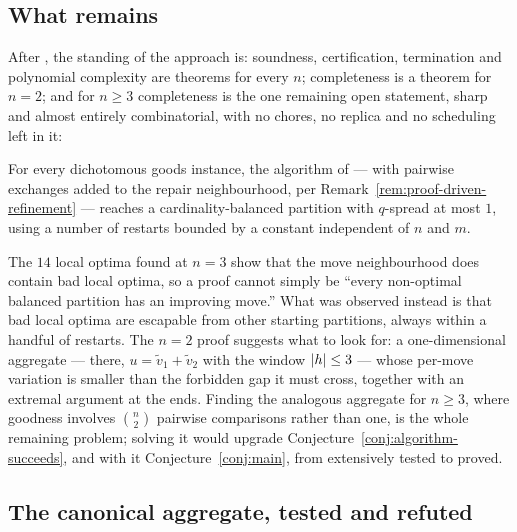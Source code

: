 \subsection{What remains}
\label{sec:construct-repair-remains}

After , the standing of the
approach is: soundness, certification, termination and polynomial complexity
are theorems for every $n$; completeness is a theorem for $n = 2$; and for
$n \ge 3$ completeness is the one remaining open statement, sharp and almost
entirely combinatorial, with no chores, no replica and no scheduling left in
it:

\begin{conjecture}
\label{conj:algorithm-succeeds}
For every dichotomous goods instance, the algorithm of
 --- with pairwise exchanges added to the repair
neighbourhood, per Remark~\ref{rem:proof-driven-refinement} --- reaches a
cardinality-balanced partition with $q$-spread at most $1$, using a number of
restarts bounded by a constant independent of $n$ and $m$.
\end{conjecture}

The $14$ local optima found at $n = 3$ show that the move neighbourhood does
contain bad local optima, so a proof cannot simply be ``every non-optimal
balanced partition has an improving move.'' What was observed instead is that
bad local optima are escapable from other starting partitions, always within a
handful of restarts. The $n = 2$ proof suggests what to look for: a
one-dimensional aggregate --- there, $u = \tilde{v}_1 + \tilde{v}_2$ with the
window $\left\lvert h\right\rvert \le 3$ --- whose per-move variation is smaller than the
forbidden gap it must cross, together with an extremal argument at the ends.
Finding the analogous aggregate for $n \ge 3$, where goodness involves
$\binom{n}{2}$ pairwise comparisons rather than one, is the whole remaining
problem; solving it would upgrade Conjecture~\ref{conj:algorithm-succeeds},
and with it Conjecture~\ref{conj:main}, from extensively tested to proved.

\subsection{The canonical aggregate, tested and refuted}
\label{sec:approach6-aggregate}


